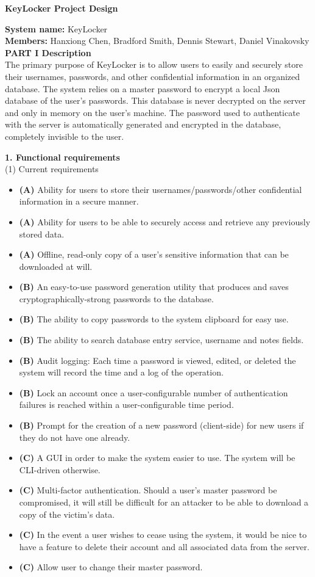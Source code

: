 \documentclass[11pt, letterpaper]{article}
\newcommand{\DesignSection}[1]
{\noindent\textbf{#1}\\}
\begin{document}
\centerline{\textbf{KeyLocker Project Design}}
\smallskip
\noindent\textbf{System name: }KeyLocker\\
\noindent\textbf{Members: }Hanxiong Chen, Bradford Smith, Dennis Stewart, Daniel Vinakovsky\\

\DesignSection{PART I Description}
\noindent
The primary purpose of KeyLocker is to allow users to easily and securely store their usernames, passwords, and other confidential information in an organized database. The system relies on a master password to encrypt a local Json database of the user's passwords. This database is never decrypted on the server and only in memory on the user's machine. The password used to authenticate with the server is automatically generated and encrypted in the database, completely invisible to the user.

\DesignSection{1. Functional requirements}
\smallskip
\noindent(1) Current requirements
\begin{itemize} \itemsep1pt \parskip0pt 
    \item \textbf{(A) }Ability for users to store their usernames/passwords/other confidential information in a secure manner.
    \item \textbf{(A) }Ability for users to be able to securely access and retrieve any previously stored data.
    \item \textbf{(A) }Offline, read-only copy of a user's sensitive information that can be downloaded at will.
    \item \textbf{(B) }An easy-to-use password generation utility that produces and saves cryptographically-strong passwords to the database.
    \item \textbf{(B) }The ability to copy passwords to the system clipboard for easy use.
    \item \textbf{(B) }The ability to search database entry service, username and notes fields.
    \item \textbf{(B) }Audit logging: Each time a password is viewed, edited, or deleted the system will record the time and a log of the operation.
    \item \textbf{(B) }Lock an account once a user-configurable number of authentication failures is reached within a user-configurable time period.
    \item \textbf{(B) }Prompt for the creation of a new password (client-side) for new users if they do not have one already.
    \item \textbf{(C) }A \ac{GUI} in order to make the system easier to use. The system will be \ac{CLI}-driven otherwise.
    \item \textbf{(C) }Multi-factor authentication. Should a user's master password be compromised, it will still be difficult for an attacker to be able to download a copy of the victim's data.
    \item \textbf{(C) }In the event a user wishes to cease using the system, it would be nice to have a feature to delete their account and all associated data from the server.
    \item \textbf{(C) }Allow user to change their master password.
\end{itemize}
\smallskip
\end{document}
